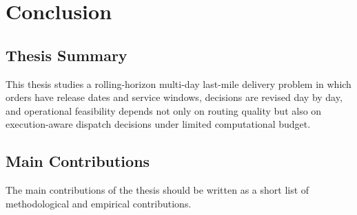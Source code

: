 \chapter{Conclusion}
\label{ch:conclusion}

%

\section{Thesis Summary}


This thesis studies a rolling-horizon multi-day last-mile delivery problem in which orders have release dates and service windows, decisions are revised day by day, and operational feasibility depends not only on routing quality but also on execution-aware dispatch decisions under limited computational budget.


\section{Main Contributions}


The main contributions of the thesis should be written as a short list of methodological and empirical contributions.

